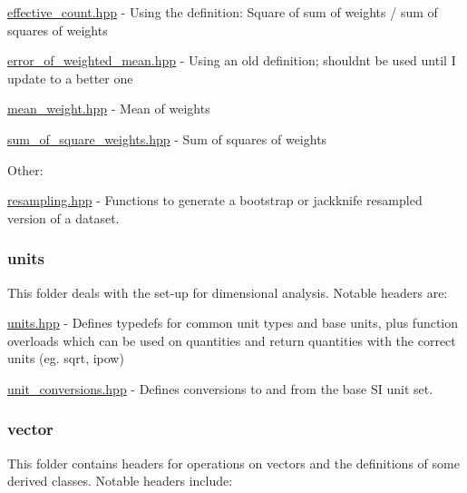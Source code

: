 \begin{DoxyItemize}
\item \hyperlink{effective__count_8hpp}{effective\+\_\+count.\+hpp} -\/ Using the definition\+: Square of sum of weights / sum of squares of weights
\item \hyperlink{error__of__weighted__mean_8hpp}{error\+\_\+of\+\_\+weighted\+\_\+mean.\+hpp} -\/ Using an old definition; shouldn\textquotesingle{}t be used until I update to a better one
\item \hyperlink{mean__weight_8hpp}{mean\+\_\+weight.\+hpp} -\/ Mean of weights
\item \hyperlink{sum__of__square__weights_8hpp}{sum\+\_\+of\+\_\+square\+\_\+weights.\+hpp} -\/ Sum of squares of weights
\end{DoxyItemize}

Other\+:


\begin{DoxyItemize}
\item \hyperlink{resampling_8hpp}{resampling.\+hpp} -\/ Functions to generate a bootstrap or jackknife resampled version of a dataset.
\end{DoxyItemize}

\subsubsection*{units}

This folder deals with the set-\/up for dimensional analysis. Notable headers are\+:


\begin{DoxyItemize}
\item \hyperlink{units_8hpp}{units.\+hpp} -\/ Defines typedefs for common unit types and base units, plus function overloads which can be used on quantities and return quantities with the correct units (eg. sqrt, ipow)
\item \hyperlink{unit__conversions_8hpp}{unit\+\_\+conversions.\+hpp} -\/ Defines conversions to and from the base S\+I unit set.
\end{DoxyItemize}

\subsubsection*{vector}

This folder contains headers for operations on vectors and the definitions of some derived classes. Notable headers include\+:


